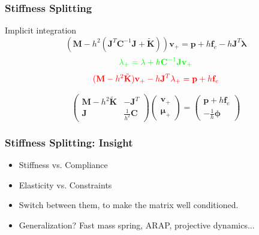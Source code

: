\documentclass[serif,mathserif]{beamer}
\newcommand{\BOLD}[1]{\mathbf{#1}}
\begin{document}
\begin{frame}
 \frametitle{Stiffness Splitting}
  Implicit integration
  \begin{equation*}
   (\BOLD{M}-h^2(\BOLD{J}^T\BOLD{C}^{-1}\BOLD{J}+\tilde{\BOLD{K}}))\BOLD{v}_+=\BOLD{p}+h\BOLD{f}_e-h\BOLD{J}^T\BOLD{\lambda}
  \end{equation*}
  \begin{equation*}
   \color{green}\BOLD{\lambda}_+ = \BOLD{\lambda}+h\BOLD{C}^{-1}\BOLD{Jv}_+
  \end{equation*}
  \begin{equation*}
   \color{red}(\BOLD{M}-h^2\tilde{\BOLD{K}})\BOLD{v}_+ - h\BOLD{J}^T\BOLD{\lambda}_+=\BOLD{p}+h\BOLD{f}_e
  \end{equation*}
  
  
  \begin{equation*}
   \begin{pmatrix}
    \BOLD{M}-h^2\BOLD{\tilde{K}} & -\BOLD{J}^T \\
    \BOLD{J} & \frac{1}{h^2}\BOLD{C}
   \end{pmatrix}
   \begin{pmatrix}
    \BOLD{v}_+ \\ \BOLD{\mu}_+
   \end{pmatrix}
   =
   \begin{pmatrix}
    \BOLD{p}+h\BOLD{f}_e \\ -\frac{1}{h}\BOLD{\phi}
   \end{pmatrix}
  \end{equation*}
\end{frame}
  
\begin{frame}
 \frametitle{Stiffness Splitting: Insight}
 \begin{itemize}
  \item {\color{red}Stiffness} vs. {\color{green}Compliance}
  \item {\color{red}Elasticity} vs. {\color{green}Constraints}
  \item Switch between them, to make the matrix well conditioned.
  \item Generalization? Fast mass spring, ARAP, projective dynamics...
 \end{itemize}
\end{frame}
\end{document}
